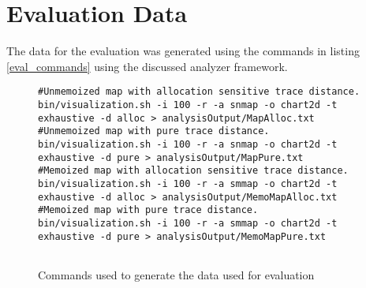 
\appendix



\section{Evaluation Data}
\label{app:tests}

The data for the evaluation was generated using the commands in listing \ref{eval_commands} using the discussed analyzer framework. 

\begin{figure}
\begin{lstlisting}[frame=single,basicstyle=\ttfamily]
#Unmemoized map with allocation sensitive trace distance. 
bin/visualization.sh -i 100 -r -a snmap -o chart2d -t exhaustive -d alloc > analysisOutput/MapAlloc.txt
#Unmemoized map with pure trace distance. 
bin/visualization.sh -i 100 -r -a snmap -o chart2d -t exhaustive -d pure > analysisOutput/MapPure.txt
#Memoized map with allocation sensitive trace distance. 
bin/visualization.sh -i 100 -r -a smmap -o chart2d -t exhaustive -d alloc > analysisOutput/MemoMapAlloc.txt
#Memoized map with pure trace distance. 
bin/visualization.sh -i 100 -r -a smmap -o chart2d -t exhaustive -d pure > analysisOutput/MemoMapPure.txt
		
\end{lstlisting}
\caption{Commands used to generate the data used for evaluation}
\label{code:eval_commands}
\end{figure}



